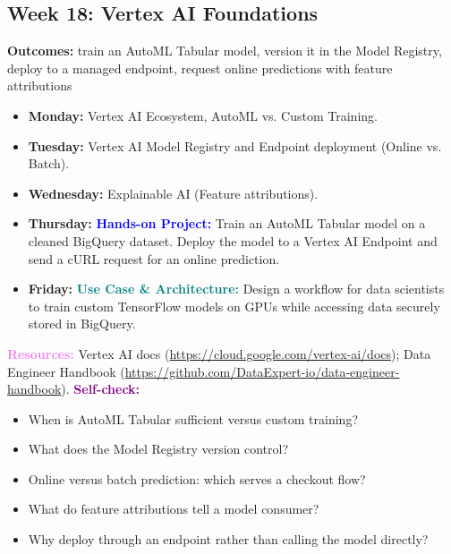 \documentclass[11pt, a4paper]{article}
\newcommand{\project}[1]{\vspace{1mm}\noindent\textbf{\textcolor{blue}{Hands-on Project:}} #1}
\newcommand{\usecase}[1]{\vspace{1mm}\noindent\textbf{\textcolor{teal}{Use Case \& Architecture:}} #1}
\newcommand{\dayitem}[2]{\item \textbf{#1:} #2}
\newcommand{\resources}[1]{\vspace{1mm}\noindent\textbf{\textcolor{violet}{Resources:}} #1}
\newcommand{\selfcheck}[1]{\vspace{1mm}\noindent\textbf{\textcolor{purple}{Self-check:}} #1}
\begin{document}
\subsection*{Week 18: Vertex AI Foundations}
\par\noindent\textbf{Outcomes:} train an AutoML Tabular model, version it in the Model Registry, deploy to a managed endpoint, request online predictions with feature attributions
\begin{itemize}[label=-]
    \dayitem{Monday}{Vertex AI Ecosystem, AutoML vs. Custom Training.}
    \dayitem{Tuesday}{Vertex AI Model Registry and Endpoint deployment (Online vs. Batch).}
    \dayitem{Wednesday}{Explainable AI (Feature attributions).}
    \dayitem{Thursday}{\project{Train an AutoML Tabular model on a cleaned BigQuery dataset. Deploy the model to a Vertex AI Endpoint and send a cURL request for an online prediction.}}
    \dayitem{Friday}{\usecase{Design a workflow for data scientists to train custom TensorFlow models on GPUs while accessing data securely stored in BigQuery.}}
\end{itemize}
\resources{Vertex AI docs (\url{https://cloud.google.com/vertex-ai/docs}); Data Engineer Handbook (\url{https://github.com/DataExpert-io/data-engineer-handbook}).}
\selfcheck{\begin{itemize}[label=-, nosep, leftmargin=1.5em]
    \item When is AutoML Tabular sufficient versus custom training?
    \item What does the Model Registry version control?
    \item Online versus batch prediction: which serves a checkout flow?
    \item What do feature attributions tell a model consumer?
    \item Why deploy through an endpoint rather than calling the model directly?
\end{itemize}}
\end{document}
